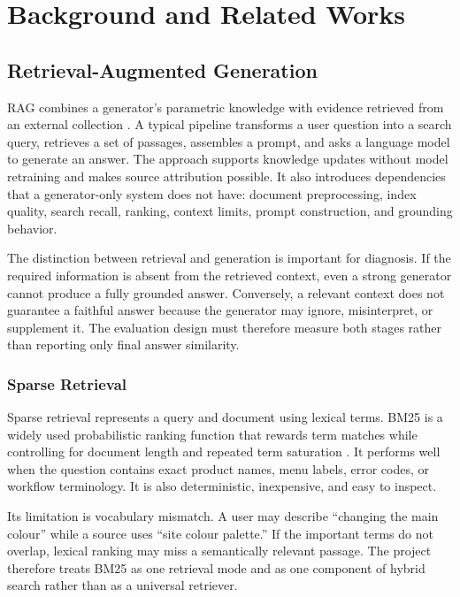 \chapter{Background and Related Works}
\label{chap:background}

\section{Retrieval-Augmented Generation}

RAG combines a generator's parametric knowledge with evidence retrieved from an
external collection \cite{lewis2020rag}. A typical pipeline transforms a user
question into a search query, retrieves a set of passages, assembles a prompt,
and asks a language model to generate an answer. The approach supports
knowledge updates without model retraining and makes source attribution
possible. It also introduces dependencies that a generator-only system does not
have: document preprocessing, index quality, search recall, ranking, context
limits, prompt construction, and grounding behavior.

The distinction between retrieval and generation is important for diagnosis.
If the required information is absent from the retrieved context, even a strong
generator cannot produce a fully grounded answer. Conversely, a relevant
context does not guarantee a faithful answer because the generator may ignore,
misinterpret, or supplement it. The evaluation design must therefore measure
both stages rather than reporting only final answer similarity.

\subsection{Sparse Retrieval}

Sparse retrieval represents a query and document using lexical terms. BM25 is a
widely used probabilistic ranking function that rewards term matches while
controlling for document length and repeated term saturation
\cite{robertson2009bm25}. It performs well when the question contains exact
product names, menu labels, error codes, or workflow terminology. It is also
deterministic, inexpensive, and easy to inspect.

Its limitation is vocabulary mismatch. A user may describe ``changing the main
colour'' while a source uses ``site colour palette.'' If the important terms do
not overlap, lexical ranking may miss a semantically relevant passage. The
project therefore treats BM25 as one retrieval mode and as one component of
hybrid search rather than as a universal retriever.


